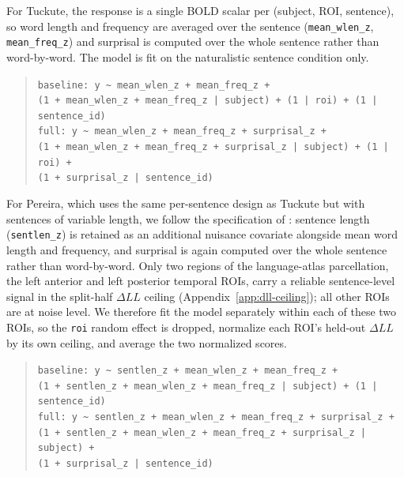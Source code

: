 For Tuckute, the response is a single BOLD scalar per (subject, ROI, sentence), so word length and frequency are averaged over the sentence (\texttt{mean\_wlen\_z}, \texttt{mean\_freq\_z}) and surprisal is computed over the whole sentence rather than word-by-word. The model is fit on the naturalistic sentence condition only.
\begin{quote}
\texttt{baseline:\ y \textasciitilde\ mean\_wlen\_z + mean\_freq\_z +}\\
\texttt{\phantom{baseline:\ y \textasciitilde\ }(1 + mean\_wlen\_z + mean\_freq\_z | subject) + (1 | roi) + (1 | sentence\_id)}\\
\texttt{full:\ y \textasciitilde\ mean\_wlen\_z + mean\_freq\_z + surprisal\_z +}\\
\texttt{\phantom{full:\ y \textasciitilde\ }(1 + mean\_wlen\_z + mean\_freq\_z + surprisal\_z | subject) + (1 | roi) +}\\
\texttt{\phantom{full:\ y \textasciitilde\ }(1 + surprisal\_z | sentence\_id)}
\end{quote}

For Pereira, which uses the same per-sentence design as Tuckute but with sentences of variable length, we follow the specification of \citet{linschuler2026surprisal}: sentence length (\texttt{sentlen\_z}) is retained as an additional nuisance covariate alongside mean word length and frequency, and surprisal is again computed over the whole sentence rather than word-by-word. Only two regions of the language-atlas parcellation, the left anterior and left posterior temporal ROIs, carry a reliable sentence-level signal in the split-half $\Delta LL$ ceiling (Appendix~\ref{app:dll-ceiling}); all other ROIs are at noise level. We therefore fit the model separately within each of these two ROIs, so the \texttt{roi} random effect is dropped, normalize each ROI's held-out $\Delta LL$ by its own ceiling, and average the two normalized scores.
\begin{quote}
\texttt{baseline:\ y \textasciitilde\ sentlen\_z + mean\_wlen\_z + mean\_freq\_z +}\\
\texttt{\phantom{baseline:\ y \textasciitilde\ }(1 + sentlen\_z + mean\_wlen\_z + mean\_freq\_z | subject) + (1 | sentence\_id)}\\
\texttt{full:\ y \textasciitilde\ sentlen\_z + mean\_wlen\_z + mean\_freq\_z + surprisal\_z +}\\
\texttt{\phantom{full:\ y \textasciitilde\ }(1 + sentlen\_z + mean\_wlen\_z + mean\_freq\_z + surprisal\_z | subject) +}\\
\texttt{\phantom{full:\ y \textasciitilde\ }(1 + surprisal\_z | sentence\_id)}
\end{quote}

